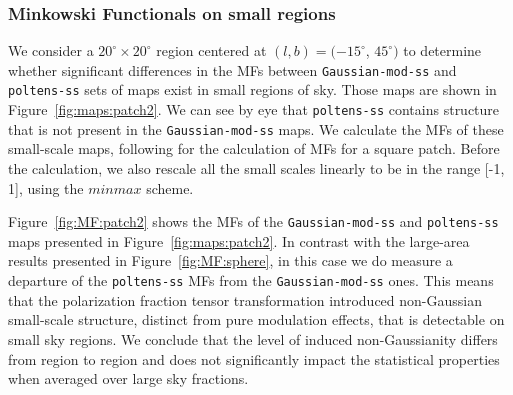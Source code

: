 \documentclass[twocolumn]{aastex631}
\newcommand{\giuse}[1]{\textcolor{orange}{(GP: #1)}}
\begin{document}
\subsubsection{Minkowski Functionals on small regions}
We consider a $20^{\circ}\times20^{\circ}$ region centered at $(l, b) = (-15^{\circ}$, $45^{\circ})$ to determine whether significant differences in the MFs between \texttt{Gaussian-mod-ss} and \texttt{poltens-ss} sets of maps exist in small regions of sky. Those maps are shown in Figure~\ref{fig:maps:patch2}. We can see by eye that \texttt{poltens-ss} contains structure that is not present in the \texttt{Gaussian-mod-ss} maps. We calculate the MFs of these small-scale maps, following \cite{Mantz:2008} for the calculation of MFs for a square patch. Before the calculation, we also rescale all the small scales linearly to be in the range [-1, 1], using the $minmax$ scheme.

Figure~\ref{fig:MF:patch2} shows the MFs of the \texttt{Gaussian-mod-ss} and \texttt{poltens-ss} maps presented in Figure~\ref{fig:maps:patch2}. In contrast with the large-area results presented in Figure~\ref{fig:MF:sphere}, in this case we do measure a departure of the \texttt{poltens-ss} MFs from the \texttt{Gaussian-mod-ss} ones. %
This means that the polarization fraction tensor transformation introduced non-Gaussian small-scale structure, distinct from pure modulation effects, that is detectable on small sky regions. 
We conclude that the level of induced non-Gaussianity differs from region to region and does not significantly impact the statistical properties when averaged over large sky fractions.

\end{document}
